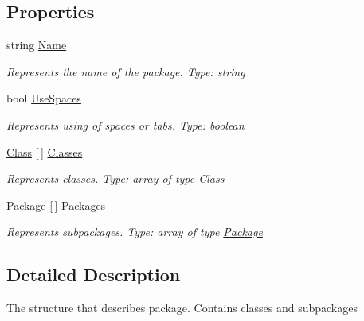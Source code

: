 \subsection*{Properties}
\begin{DoxyCompactItemize}
\item 
string \mbox{\hyperlink{classCodeGen_1_1generators_1_1Package_a8da357302a6d399ce554f7a71bc4a90d}{Name}}
\begin{DoxyCompactList}\small\item\em Represents the name of the package. Type\+: string \end{DoxyCompactList}\item 
bool \mbox{\hyperlink{classCodeGen_1_1generators_1_1Package_af03f90e7753d7fdc68699c32f86f82e9}{Use\+Spaces}}
\begin{DoxyCompactList}\small\item\em Represents using of spaces or tabs. Type\+: boolean \end{DoxyCompactList}\item 
\mbox{\hyperlink{classCodeGen_1_1generators_1_1Class}{Class}} \mbox{[}$\,$\mbox{]} \mbox{\hyperlink{classCodeGen_1_1generators_1_1Package_a7bdaec0ad570345975582ca99076d4dd}{Classes}}
\begin{DoxyCompactList}\small\item\em Represents classes. Type\+: array of type \mbox{\hyperlink{classCodeGen_1_1generators_1_1Class}{Class}} \end{DoxyCompactList}\item 
\mbox{\hyperlink{classCodeGen_1_1generators_1_1Package}{Package}} \mbox{[}$\,$\mbox{]} \mbox{\hyperlink{classCodeGen_1_1generators_1_1Package_a014a74cbc2bc2876e24d5a250cb54c68}{Packages}}
\begin{DoxyCompactList}\small\item\em Represents subpackages. Type\+: array of type \mbox{\hyperlink{classCodeGen_1_1generators_1_1Package}{Package}} \end{DoxyCompactList}\end{DoxyCompactItemize}


\subsection{Detailed Description}
The structure that describes package. Contains classes and subpackages 




